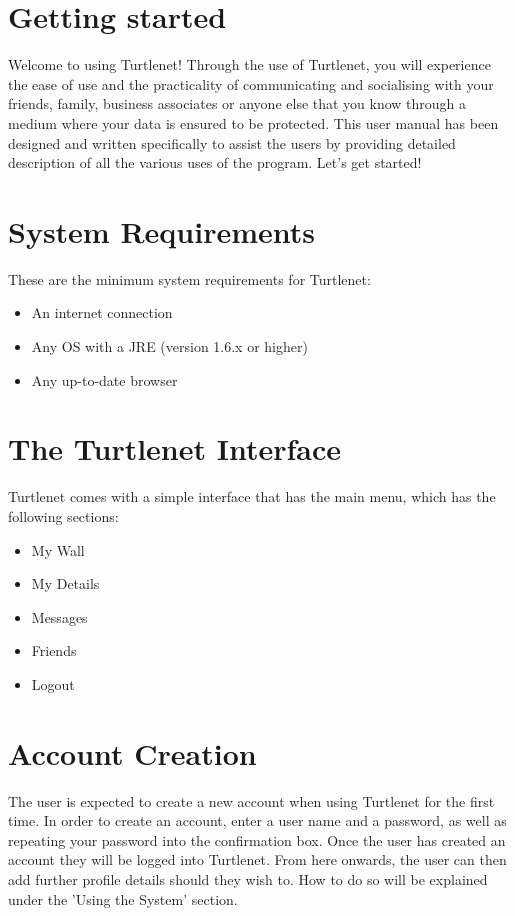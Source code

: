 \section{Getting started}
Welcome to using Turtlenet!  Through the use of Turtlenet, you will experience
the ease of use and the practicality of communicating and socialising with your
friends, family, business associates or anyone else that you know through a
medium where your data is ensured to be protected.  This user manual has been
designed and written specifically to assist the users by providing detailed
description of all the various uses of the program.  Let's get started!

\section{System Requirements}
These are the minimum system requirements for Turtlenet:

\begin{itemize}
\item An internet connection
\item Any OS with a JRE (version 1.6.x or higher)
\item Any up-to-date browser
\end{itemize}

\section{The Turtlenet Interface}
Turtlenet comes with a simple interface that has the main menu, which has the
following sections:
\begin{itemize}
\item My Wall
\item My Details
\item Messages
\item Friends
\item Logout
\end{itemize}

\section{Account Creation}
The user is expected to create a new account when using Turtlenet for the first
time.  In order to create an account, enter a user name and a password, as well
as repeating your password into the confirmation box.  Once the user has 
created an account they will be logged into Turtlenet.  From here onwards, the
user can then add further profile details should they wish to. How to do so will
be explained under the 'Using the System' section.
